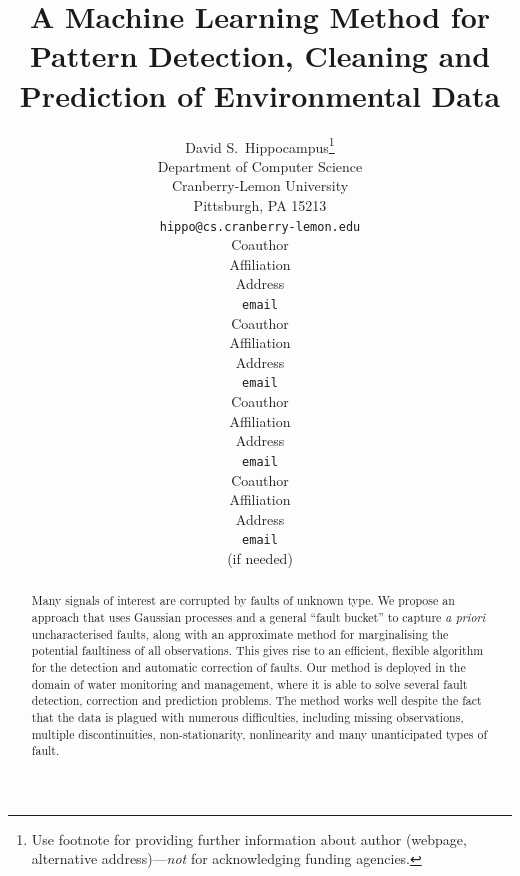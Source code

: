 \documentclass{article} %
\title{A Machine Learning Method for Pattern Detection, Cleaning and
Prediction of Environmental Data}
\begin{document}
\maketitle

\author{
David S.~Hippocampus\thanks{ Use footnote for providing further information
about author (webpage, alternative address)---\emph{not} for acknowledging
funding agencies.} \\
Department of Computer Science\\
Cranberry-Lemon University\\
Pittsburgh, PA 15213 \\
\texttt{hippo@cs.cranberry-lemon.edu} \\
\And
Coauthor \\
Affiliation \\
Address \\
\texttt{email} \\
\AND
Coauthor \\
Affiliation \\
Address \\
\texttt{email} \\
\And
Coauthor \\
Affiliation \\
Address \\
\texttt{email} \\
\And
Coauthor \\
Affiliation \\
Address \\
\texttt{email} \\
(if needed)\\
}

\begin{abstract}
Many signals of interest are corrupted by faults of unknown type. We
propose an approach that uses Gaussian processes and a general ``fault
bucket'' to capture \textit{a priori} uncharacterised faults, along
with an approximate method for marginalising the potential faultiness
of all observations. This gives rise to an efficient, flexible
algorithm for the detection and automatic correction of faults. Our
method is deployed in the domain of water monitoring and management,
where it is able to solve several fault detection, correction and
prediction problems. The method works well despite the fact that the
data is plagued with numerous difficulties, including missing
observations, multiple discontinuities, non-stationarity, nonlinearity
and many unanticipated types of fault.
\end{abstract}
\end{document}
